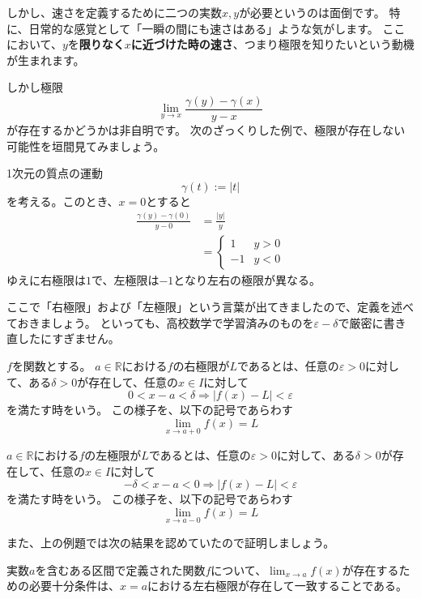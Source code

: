 しかし、速さを定義するために二つの実数$x,y$が必要というのは面倒です。
特に、日常的な感覚として「一瞬の間にも速さはある」ような気がします。
ここにおいて、$y$を\textbf{限りなく$x$に近づけた時の速さ}、つまり極限を知りたいという動機が生まれます。

しかし極限
\[
  \lim_{y\to x}\frac{\gamma(y)-\gamma(x)}{y-x}
\]
が存在するかどうかは非自明です。
次のざっくりした例で、極限が存在しない可能性を垣間見てみましょう。

\begin{example}
  1次元の質点の運動
  \[
    \gamma(t):=|t|
  \]
  を考える。このとき、$x=0$とすると
  \begin{align*}
    \frac{\gamma(y)-\gamma(0)}{y-0}&=\frac{|y|}{y}\\
    &=\begin{cases}
      1 & y>0\\
      -1 & y<0
    \end{cases}
  \end{align*}
  ゆえに右極限は$1$で、左極限は$-1$となり左右の極限が異なる。
\end{example}
ここで「右極限」および「左極限」という言葉が出てきましたので、定義を述べておきましょう。
といっても、高校数学で学習済みのものを$\varepsilon-\delta$で厳密に書き直したにすぎません。
\begin{definition}
  $f$を関数とする。
  $a\in\mathbb{R}$における$f$の右極限が$L$であるとは、任意の$\varepsilon>0$に対して、ある$\delta>0$が存在して、任意の$x\in I$に対して
  \[0<x-a<\delta\Rightarrow|f(x)-L|<\varepsilon\]
  を満たす時をいう。
  この様子を、以下の記号であらわす
  \[
    \lim_{x\to a+0}f(x)=L
  \]

  $a\in\mathbb{R}$における$f$の左極限が$L$であるとは、任意の$\varepsilon>0$に対して、ある$\delta>0$が存在して、任意の$x\in I$に対して
  \[-\delta<x-a<0\Rightarrow|f(x)-L|<\varepsilon\]
  を満たす時をいう。
  この様子を、以下の記号であらわす
  \[
    \lim_{x\to a-0}f(x)=L
  \]
\end{definition}
また、上の例題では次の結果を認めていたので証明しましょう。
\begin{theorem}
  実数$a$を含むある区間で定義された関数$f$について、$\lim_{x\to a}f(x)$が存在するための必要十分条件は、$x=a$における左右極限が存在して一致することである。
\end{theorem}
